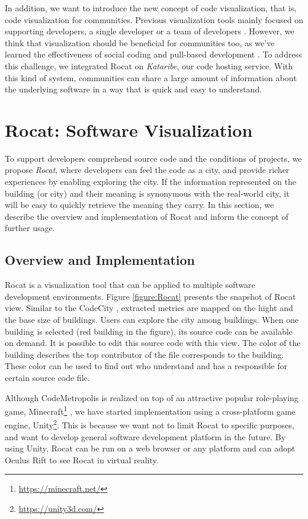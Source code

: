\documentclass[conference]{IEEEtran}
\newcommand{\figref}[1]{Figure \ref{#1}}
\begin{document}
In addition, we want to introduce the new concept of code visualization, that is, code visualization for communities.
Previous visualization tools mainly focused on supporting developers, a single developer \cite{Wettel:2011:SSC:1985793.1985868} or a team of developers \cite{6648194}.
However, we think that visualization should be beneficial for communities too, as we've learned the effectiveness of social coding \cite{Dabbish:2012:SCG:2145204.2145396} and pull-based development \cite{Gousios:2014:ESP:2568225.2568260}.
To address this challenge, we integrated Rocat on \textit{Kataribe},  our code hosting service.
With this kind of system, communities can share a large amount of information about the underlying software in a way that is quick and easy to understand.

\section{Rocat: Software Visualization}
To support developers comprehend source code and the conditions of projects, we propose \textit{Rocat}, where developers can feel the code as a city, and provide richer experiences by enabling exploring the city.
If the information represented on the building (or city) and their meaning is synonymous with the real-world city, it will be easy to quickly retrieve the meaning they carry.
In this section, we describe the overview and implementation of Rocat and inform the concept of further usage.

\subsection{Overview and Implementation}
Rocat is a visualization tool that can be applied to multiple software development environments.
\figref{figure:Rocat} presents the snapshot of Rocat view.
Similar to the CodeCity \cite{Wettel:2011:SSC:1985793.1985868}, extracted metrics are mapped on the hight and the base size of buildings.
Users can explore the city among buildings.
When one building is selected (red building in the figure), its source code can be available on demand.
It is possible to edit this source code with this view.
The color of the building describes the top contributor of the file corresponds to the building.
These color can be used to find out who understand and has a responsible for certain source code file.

Although CodeMetropolis is realized on top of an attractive popular role-playing game, Minecraft\footnote{\url{https://minecraft.net/}} \cite{6648194}, we have started implementation using a cross-platform game engine, Unity\footnote{\url{https://unity3d.com/}}.
This is because we want not to limit Rocat to specific purposes, and want to develop general software development platform in the future.
By using Unity, Rocat can be run on a web browser or any platform and can adopt Oculus Rift to see Rocat in virtual reality.
\end{document}
